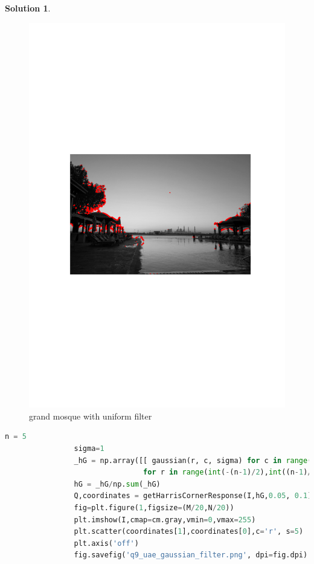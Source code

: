\documentclass[11pt]{article}
\theoremstyle{plain}
\theoremstyle{definition}
\newtheorem{solution}{Solution}
\theoremstyle{remark}
\begin{document}
\begin{solution}
\begin{enumerate}
			\begin{figure}[h]
				\centering
				\includegraphics[width=\textwidth]{q9_uae_uniform_filter.png}
				\caption{grand mosque with uniform filter}
			\end{figure}
			
			\begin{lstlisting}[language=Python, caption=grand mosque with gaussian filter]
				n = 5
				sigma=1
				_hG = np.array([[ gaussian(r, c, sigma) for c in range(int(-(n-1)/2),int((n-1)/2 + 1))] 
				                for r in range(int(-(n-1)/2),int((n-1)/2 + 1))])
				hG = _hG/np.sum(_hG)
				Q,coordinates = getHarrisCornerResponse(I,hG,0.05, 0.1)
				fig=plt.figure(1,figsize=(M/20,N/20))
				plt.imshow(I,cmap=cm.gray,vmin=0,vmax=255)
				plt.scatter(coordinates[1],coordinates[0],c='r', s=5)
				plt.axis('off')
				fig.savefig('q9_uae_gaussian_filter.png', dpi=fig.dpi)
			\end{lstlisting}
			

\end{enumerate}
\end{solution}
\end{document}
